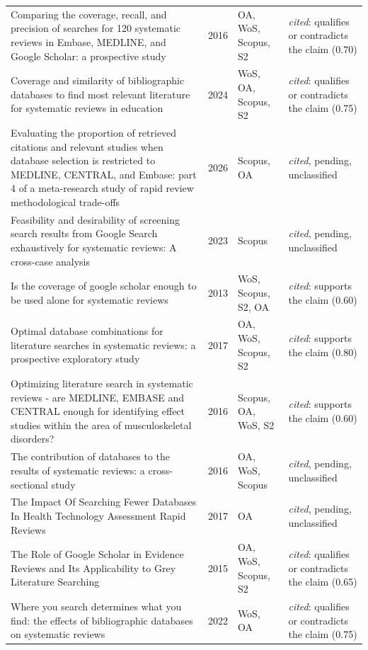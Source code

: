 \begin{longtable}{@{}%
  >{\raggedright\arraybackslash}p{}c%
  >{\raggedright\arraybackslash}p{}%
  >{\raggedright\arraybackslash}p{}@{}}
Comparing the coverage, recall, and precision of searches for 120 systematic reviews in Embase, MEDLINE, and Google Scholar: a prospective study & 2016 & OA, WoS, Scopus, S2 & \emph{cited}: qualifies or contradicts the claim (0.70) \\
Coverage and similarity of bibliographic databases to find most relevant literature for systematic reviews in education & 2024 & WoS, OA, Scopus, S2 & \emph{cited}: qualifies or contradicts the claim (0.75) \\
Evaluating the proportion of retrieved citations and relevant studies when database selection is restricted to MEDLINE, CENTRAL, and Embase: part 4 of a meta-research study of rapid review methodological trade-offs & 2026 & Scopus, OA & \emph{cited}, pending, unclassified \\
Feasibility and desirability of screening search results from Google Search exhaustively for systematic reviews: A cross-case analysis & 2023 & Scopus & \emph{cited}, pending, unclassified \\
Is the coverage of google scholar enough to be used alone for systematic reviews & 2013 & WoS, Scopus, S2, OA & \emph{cited}: supports the claim (0.60) \\
Optimal database combinations for literature searches in systematic reviews: a prospective exploratory study & 2017 & OA, WoS, Scopus, S2 & \emph{cited}: supports the claim (0.80) \\
Optimizing literature search in systematic reviews - are MEDLINE, EMBASE and CENTRAL enough for identifying effect studies within the area of musculoskeletal disorders? & 2016 & Scopus, OA, WoS, S2 & \emph{cited}: supports the claim (0.60) \\
The contribution of databases to the results of systematic reviews: a cross-sectional study & 2016 & OA, WoS, Scopus & \emph{cited}, pending, unclassified \\
The Impact Of Searching Fewer Databases In Health Technology Assessment Rapid Reviews & 2017 & OA & \emph{cited}, pending, unclassified \\
The Role of Google Scholar in Evidence Reviews and Its Applicability to Grey Literature Searching & 2015 & OA, WoS, Scopus, S2 & \emph{cited}: qualifies or contradicts the claim (0.65) \\
Where you search determines what you find: the effects of bibliographic databases on systematic reviews & 2022 & WoS, OA & \emph{cited}: qualifies or contradicts the claim (0.75) \\

\end{longtable}
